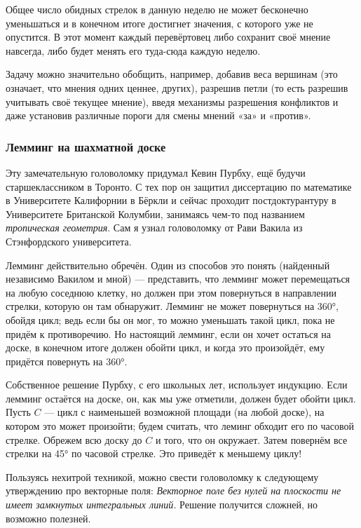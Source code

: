 Общее число обидных стрелок в данную неделю не может бесконечно уменьшаться и в конечном итоге достигнет значения, с которого уже не опустится.
В этот момент каждый перевёртовец либо сохранит своё мнение навсегда, либо будет менять его туда-сюда каждую неделю.

\medskip

Задачу можно значительно обобщить, например, добавив веса вершинам (это означает, что мнения одних ценнее, других), разрешив петли (то есть разрешив учитывать своё текущее мнение), введя механизмы разрешения конфликтов и даже установив различные пороги для смены мнений «за» и «против».

\subsubsection*{Лемминг на шахматной доске}

Эту замечательную головоломку придумал Кевин Пурбху, ещё будучи старшеклассником в Торонто.
С тех пор он защитил диссертацию по математике в Университете Калифорнии в Бёркли и
сейчас проходит постдоктурантуру в Университете Британской Колумбии,
занимаясь чем-то под названием \emph{тропическая геометрия}.
Сам я узнал головоломку от Рави Вакила из Стэнфордского университета.

Лемминг действительно обречён.
Один из способов это понять (найденный независимо Вакилом и мной) --- представить, что лемминг может перемещаться на любую соседнюю клетку, но должен при этом повернуться в направлении стрелки, которую он там обнаружит.
Лемминг не может повернуться на 360°, обойдя цикл;
ведь если бы он мог, то можно уменьшать такой цикл, пока не придём к противоречию.
Но настоящий лемминг, если он хочет остаться на доске, в конечном итоге должен обойти цикл, и когда это произойдёт, ему придётся повернуть на 360°.

Собственное решение Пурбху, с его школьных лет, использует индукцию.
Если лемминг остаётся на доске, он, как мы уже отметили, должен будет обойти цикл.
Пусть $C$ --- цикл с наименьшей возможной площади (на любой доске), на котором это может произойти; будем считать, что леминг обходит его по часовой стрелке.
Обрежем всю доску до $C$ и того, что он окружает.
Затем повернём все стрелки на 45° по часовой стрелке.
Это приведёт к меньшему циклу!

\begin{addedbytheeditors}
Пользуясь нехитрой техникой, можно свести головоломку к следующему утверждению про векторные поля: \emph{Векторное поле без нулей на плоскости не имеет замкнутых интегральных линий.}
Решение получится сложней, но возможно полезней.\pr
\end{addedbytheeditors}
